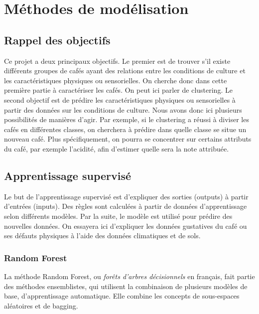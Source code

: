 
\chapter{Méthodes de modélisation}
\section{Rappel des objectifs}\label{obj}
Ce projet a deux principaux objectifs. Le premier est de trouver s'il existe différents groupes de cafés ayant des relations entre les conditions de culture et les caractéristiques physiques ou sensorielles. On cherche donc dans cette première partie à caractériser les cafés. On peut ici parler de clustering.  Le second objectif est de prédire les caractéristiques physiques ou sensorielles à partir des données sur les conditions de culture. Nous avons donc ici plusieurs possibilités de manières d'agir. Par exemple, si le clustering a réussi à diviser les cafés en différentes classes, on cherchera à prédire dans quelle classe se situe un nouveau café. Plus spécifiquement, on pourra se concentrer sur certains attributs du café, par exemple l'acidité, afin d'estimer quelle sera la note attribuée. 



\newpage

\section{Apprentissage supervisé}
Le but de l'apprentissage supervisé est d'expliquer des sorties (outputs) à partir d'entrées (inputs). Des règles sont calculées à partir de données d'apprentissage selon différents modèles. Par la suite, le modèle est utilisé pour prédire des nouvelles données. On essayera ici d'expliquer les données gustatives du café ou ses défauts physiques à l'aide des données climatiques et de sols. 


\subsection{Random Forest}

La méthode Random Forest, ou \textit{forêts d'arbres décisionnels} en français, fait partie des méthodes ensemblistes\cite{EnsembleMethods}, qui utilisent la combinaison de plusieurs modèles de base, d'apprentissage automatique. Elle combine les concepts de sous-espaces aléatoires et de bagging.\\

